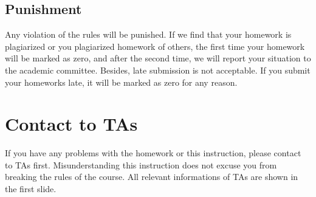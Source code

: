 \documentclass[10pt,twocolumn,letterpaper]{article}
\begin{document}
\subsection{Punishment}
Any violation of the rules will be punished. If we find that your homework is plagiarized or you plagiarized homework of others, the first time your homework will be marked as zero, and after the second time, we will report your situation to the academic committee. Besides, late submission is not acceptable. If you submit your homeworks late, it will be marked as zero for any reason.

\section{Contact to TAs}
If you have any problems with the homework or this instruction, please contact to TAs first. Misunderstanding this instruction does not excuse you from breaking the rules of the course. All relevant informations of TAs are shown in the first slide. 


{\small


}
\end{document}
